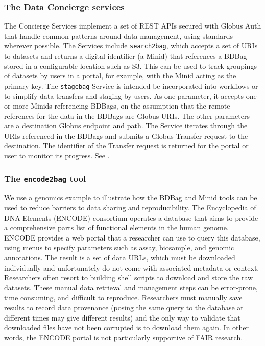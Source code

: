 \documentclass[11pt]{article}
\begin{document}
\subsubsection{The Data Concierge services}

The Concierge Services implement a set of REST APIs secured with Globus Auth that handle common patterns around data management, using standards wherever possible. 
The Services include \texttt{search2bag}, which accepts a set of URIs to datasets and returns a digital identifier (a Minid) that references a BDBag stored in a configurable location such as S3. 
This can be used to track groupings of datasets by users in a portal, for example, with the Minid acting as the primary key. 
The \texttt{stagebag} Service is intended be incorporated into workflows or to simplify data transfers and staging by users. 
As one parameter, it accepts one or more Minids referencing BDBags, on the assumption that the remote references for the data in the BDBags are Globus URIs. 
The other parameters are a destination Globus endpoint and path. 
The Service iterates through the URIs referenced in the BDBags and submits a Globus Transfer request to the destination. 
The identifier of the Transfer request is returned for the portal or user to monitor its progress. 
See .

\subsubsection{The \texttt{encode2bag} tool}

We use a genomics example to illustrate how the BDBag and Minid tools can be used to reduce
barriers to data sharing and reproducibility.
The Encyclopedia of DNA Elements (ENCODE) consortium operates a database that aims to provide a
comprehensive parts list of functional elements in the human genome.
ENCODE provides a web portal that a researcher can use to query this database,
using menus to specify parameters such as assay, biosample, and genomic annotations.
The result is a set of data URLs,
which must be downloaded individually and unfortunately do not come with associated metadata or context.
Researchers often resort to building shell scripts to download and store the raw datasets.
These manual data retrieval and management steps can be error-prone,
time consuming, and difficult to reproduce.
Researchers must manually save results to record data provenance (posing the same query to the database at different
times may give different results)
and the only way to validate that downloaded files have not been corrupted is to download them again.
In other words, the ENCODE portal is not particularly supportive of FAIR research.
\end{document}
